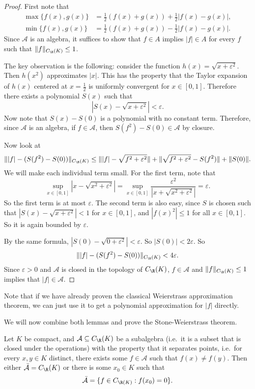 \documentclass[a4paper]{article}
\begin{document}
\begin{proof}
  First note that
  \begin{align*}
    \max\{f(x), g(x)\} &= \frac{1}{2}(f(x) + g(x)) + \frac{1}{2}|f(x) - g(x)|,\\
    \min\{f(x), g(x)\} &= \frac{1}{2}(f(x) + g(x)) - \frac{1}{2}|f(x) - g(x)|.
  \end{align*}
  Since $\mathcal{A}$ is an algebra, it suffices to show that $f \in A$ implies $|f| \in A$ for every $f$ such that $\|f\|_{C_\R(K)} \leq 1$.

  The key observation is the following: consider the function $h(x) = \sqrt{x + \varepsilon^2}$. Then $h(x^2)$ approximates $|x|$. This has the property that the Taylor expansion of $h(x)$ centered at $x = \frac{1}{2}$ is uniformly convergent for $x \in [0, 1]$. Therefore there exists a polynomial $S(x)$ such that
  \[
    |S(x) - \sqrt{x + \varepsilon^2}| < \varepsilon.
  \]
  Now note that $S(x) - S(0)$ is a polynomial with no constant term. Therefore, since $\mathcal{A}$ is an algebra, if $f \in \mathcal{A}$, then $S(f^2) - S(0) \in \mathcal{A}$ by closure.

  Now look at
  \[
    \||f| - (S(f^2) - S(0))\|_{C_\R(K)} \leq \||f| - \sqrt{f^2 + \varepsilon^2}\| + \|\sqrt{f^2 + \varepsilon^2} - S(f^2)\| + \|S(0)\|.
  \]
  We will make each individual term small. For the first term, note that
  \[
    \sup_{x \in [0, 1]} |x - \sqrt{x^2 + \varepsilon^2}| = \sup_{x \in [0, 1]} \frac{\varepsilon^2}{|x + \sqrt{x^2 + \varepsilon^2}|} = \varepsilon.
  \]
  So the first term is at most $\varepsilon$. The second term is also easy, since $S$ is chosen such that $|S(x) - \sqrt{x + \varepsilon^2}| < 1$ for $x \in [0, 1]$, and $|f(x)^2| \leq 1$ for all $x \in [0, 1]$. So it is again bounded by $\varepsilon$.

  By the same formula, $|S(0) - \sqrt{0 + \varepsilon^2}| < \varepsilon$. So $|S(0)| < 2\varepsilon$. So
  \[
    \||f| - (S(f^2) - S(0))\|_{C_\R(K)} < 4\varepsilon.
  \]
  Since $\varepsilon > 0$ and $\mathcal{A}$ is closed in the topology of $C_{\R}(K)$, $f\in \mathcal{A}$ and $\|f\|_{C_\R(K)} \leq 1$ implies that $|f| \in \mathcal{A}$.
\end{proof}
Note that if we have already proven the classical Weierstrass approximation theorem, we can just use it to get a polynomial approximation for $|f|$ directly.

We will now combine both lemmas and prove the Stone-Weierstrass theorem.
\begin{thm}
  Let $K$ be compact, and $\mathcal{A} \subseteq C_{\R}(K)$ be a subalgebra (i.e.\ it is a subset that is closed under the operations) with the property that it separates points, i.e.\ for every $x, y \in K$ distinct, there exists some $f \in \mathcal{A}$ such that $f(x) \not= f(y)$. Then either $\bar{\mathcal{A}} = C_\R(K)$ or there is some $x_0 \in K$ such that
  \[
    \bar{\mathcal{A}} = \{f \in C_{\R(K)}: f(x_0) = 0\}.
  \]
\end{thm}
\end{document}
